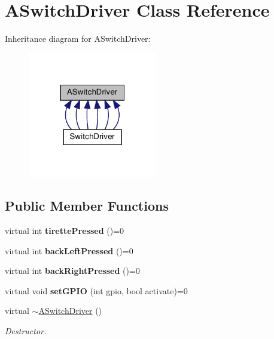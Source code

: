 \hypertarget{classASwitchDriver}{}\section{A\+Switch\+Driver Class Reference}
\label{classASwitchDriver}


Inheritance diagram for A\+Switch\+Driver\+:
\nopagebreak
\begin{figure}[H]
\begin{center}
\leavevmode
\includegraphics[width=160pt]{classASwitchDriver__inherit__graph}
\end{center}
\end{figure}
\subsection*{Public Member Functions}
\begin{DoxyCompactItemize}
\item 
\mbox{\label{classASwitchDriver_a5c69cf353092d6f499e22f2baec6a40b}} 
virtual int {\bfseries tirette\+Pressed} ()=0
\item 
\mbox{\label{classASwitchDriver_a91dd36990d10aad246f1a531c933ab33}} 
virtual int {\bfseries back\+Left\+Pressed} ()=0
\item 
\mbox{\label{classASwitchDriver_a5a55c4ac9814a09398ff8f00abe63b4f}} 
virtual int {\bfseries back\+Right\+Pressed} ()=0
\item 
\mbox{\label{classASwitchDriver_a2d588b7ccdbd7197448e2b237d5de788}} 
virtual void {\bfseries set\+G\+P\+IO} (int gpio, bool activate)=0
\item 
\mbox{\label{classASwitchDriver_ab9894a4eeaafbd97f352129ec487d980}} 
virtual \hyperlink{classASwitchDriver_ab9894a4eeaafbd97f352129ec487d980}{$\sim$\+A\+Switch\+Driver} ()
\begin{DoxyCompactList}\small\item\em Destructor. \end{DoxyCompactList}\end{DoxyCompactItemize}
